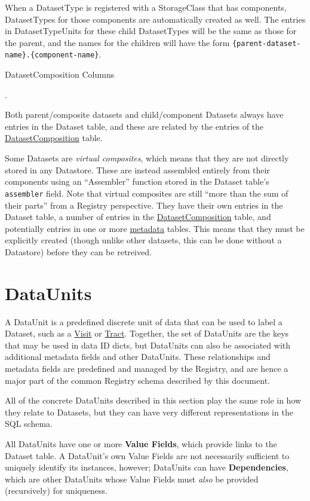 \documentclass[DM,toc]{lsstdoc}
\newcommand{\tblref}[1]{\hyperref[tbl:#1]{#1}}
\newcommand{\unitref}[1]{\hyperref[unit:#1]{#1}}
\newcommand{\coltable}[1]{
    \begin{table}[htb]
        {
            \footnotesize
            
        }
        \caption{#1 Columns}
        \label{tbl:#1}
    \end{table}
}
\begin{document}
When a DatasetType is registered with a StorageClass that has components, DatasetTypes for those components are automatically created as well.
The entries in DatasetTypeUnits for these child DatasetTypes will be the same as those for the parent, and the names for the children will have the form \texttt{\{parent-dataset-name\}.\{component-name\}}.

\coltable{DatasetComposition}.

Both parent/composite datasets and child/component Datasets always have entries in the Dataset table, and these are related by the entries of the \tblref{DatasetComposition} table.

Some Datasets are \emph{virtual composites}, which means that they are not
directly stored in any Datastore.
These are instead assembled entirely from their components using an ``Assembler'' function stored in the Dataset table's \texttt{assembler} field.
Note that virtual composites are still ``more than the sum of their parts'' from a Registry perspective.
They have their own entries in the Dataset table, a number of entries in the \tblref{DatasetComposition} table, and potentially entries in one or more \hyperref[sec:metadata]{metadata} tables.
This means that they must be explicitly created (though unlike other datasets, this can be done without a Datastore) before they can be retreived.

\section{DataUnits}
\label{sec:dataunits}

A DataUnit is a predefined discrete unit of data that can be used to label a Dataset, such as a \unitref{Visit} or \unitref{Tract}.
Together, the set of DataUnits are the keys that may be used in data ID dicts, but DataUnits can also be associated with additional metadata fields and other DataUnits.
These relationships and metadata fields are predefined and managed by the Registry, and are hence a major part of the common Registry schema described by this document.

All of the concrete DataUnits described in this section play the same role in how they relate to Datasets, but they can have very different representations in the SQL schema.

All DataUnits have one or more \textbf{Value Fields}, which provide links to the Dataset table.
A DataUnit's own Value Fields are not necessarily sufficient to uniquely identify its instances, however; DataUnits can have \textbf{Dependencies}, which are other DataUnits whose Value Fields must \emph{also} be provided (recursively) for uniqueness.
\end{document}
